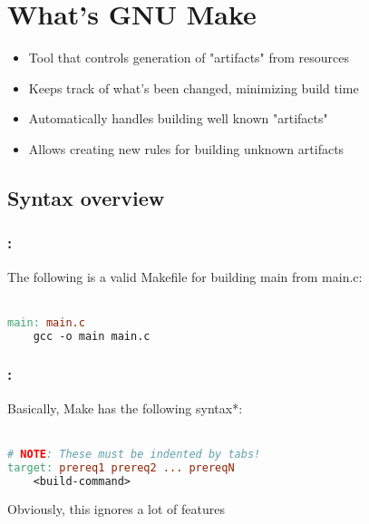 \section{What's GNU Make}

\begin{frame}{\secname}
    \begin{itemize}
        \item Tool that controls generation of "artifacts" from resources
        \item Keeps track of what's been changed, minimizing build time
        \item Automatically handles building well known "artifacts"
        \item Allows creating new rules for building unknown artifacts
    \end{itemize}
\end{frame}

\subsection{Syntax overview}
\begin{frame}[fragile]
    \frametitle{\secname: \small\subsecname\normalsize}

    The following is a valid Makefile for building main from main.c: \\~\\

    \begin{lstlisting}[language=make]
main: main.c
    gcc -o main main.c
    \end{lstlisting}

\end{frame}

\begin{frame}[fragile]
    \frametitle{\secname: \small\subsecname\normalsize}

    Basically, Make has the following syntax*: \\~\\

    \begin{lstlisting}[language=make]
# NOTE: These must be indented by tabs!
target: prereq1 prereq2 ... prereqN
    <build-command>
    \end{lstlisting}

    \small * Obviously, this ignores a lot of features
\end{frame}

